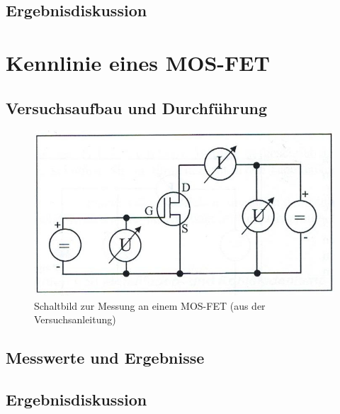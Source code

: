 \documentclass{scrartcl}
\begin{document}
\subsection{Ergebnisdiskussion}




\pagebreak
\section{Kennlinie eines MOS-FET}
\subsection{Versuchsaufbau und Durchführung}

\begin{figure}[H]
  \centering
    \includegraphics[scale=0.75]{Aufbau4.JPG}
  \caption{Schaltbild zur Messung an einem MOS-FET (aus der Versuchsanleitung)}
  \label{fig:Aufbau4}
\end{figure}

\subsection{Messwerte und Ergebnisse}

\subsection{Ergebnisdiskussion}
\end{document}
